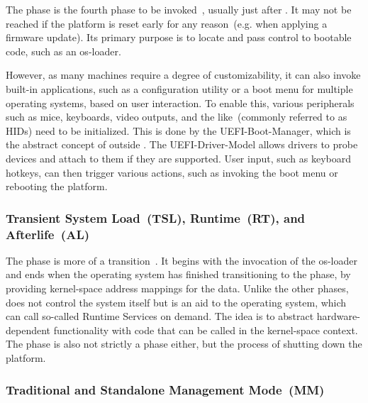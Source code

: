 The  phase is the fourth phase to be invoked~\cite{pi-spec}, usually just after . It may not be reached if the platform is reset early for any reason~(e.g. when applying a \gls{firmware} update). Its primary purpose is to locate and pass control to bootable code, such as an \gls{os-loader}.

However, as many machines require a degree of customizability, it can also invoke built-in applications, such as a configuration utility or a boot menu for multiple operating systems, based on user interaction. To enable this, various peripherals such as mice, keyboards, video outputs, and the like~(commonly referred to as \glspl{HID}) need to be initialized. This is done by the \gls{UEFI-Boot-Manager}, which is the abstract concept of  outside . The \gls{UEFI-Driver-Model} allows drivers to probe devices and attach to them if they are supported. User input, such as keyboard hotkeys, can then trigger various actions, such as invoking the boot menu or rebooting the platform.

\subsubsection{Transient System Load~(TSL), Runtime~(RT), and Afterlife~(AL)}

The  phase is more of a transition~\cite{pi-spec}. It begins with the invocation of the \gls{os-loader} and ends when the operating system has finished transitioning  to the  phase, by providing \gls{kernel-space} address mappings for the   data. Unlike the other phases,  does not control the system itself but is an aid to the operating system, which can call so-called  Runtime Services on demand. The idea is to abstract hardware-dependent functionality with  code that can be called in the \gls{kernel-space} context. The  phase is also not strictly a phase either, but the process of shutting down the platform.

\subsubsection{Traditional and Standalone Management Mode~(MM)}


